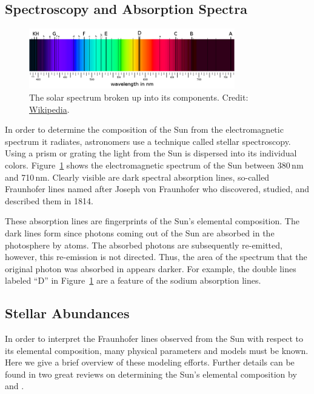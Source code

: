 \subsection{Spectroscopy and Absorption Spectra}

\begin{figure}[tb]
    \centering
    \includegraphics[width=0.8\textwidth]{graphics/solar_system_abundances/fraunhofer_lines_800px}
    \caption{The solar spectrum broken up into its components. Credit: \href{https://en.wikipedia.org/wiki/Fraunhofer_lines}{Wikipedia}.}
    \label{fig:fraunhofer_lines}
\end{figure}
In order to determine the composition of the Sun from the electromagnetic spectrum it radiates, astronomers use a technique called stellar spectroscopy. Using a prism or grating the light from the Sun is dispersed into its individual colors. Figure~\ref{fig:fraunhofer_lines} shows the electromagnetic spectrum of the Sun between 380\,nm and 710\,nm. Clearly visible are dark spectral absorption lines, so-called Fraunhofer lines named after Joseph von Fraunhofer who discovered, studied, and described them in 1814.

These absorption lines are fingerprints of the Sun's elemental composition. The dark lines form since photons coming out of the Sun are absorbed in the photosphere by atoms. The absorbed photons are subsequently re-emitted, however, this re-emission is not directed. Thus, the area of the spectrum that the original photon was absorbed in appears darker. For example, the double lines labeled ``D'' in Figure~\ref{fig:fraunhofer_lines} are a feature of the sodium absorption lines.


\subsection{Stellar Abundances} \label{sec:solar_abundances:sun:stellar_abundances}

In order to interpret the Fraunhofer lines observed from the Sun with respect to its elemental composition, many physical parameters and models must be known. Here we give a brief overview of these modeling efforts. Further details can be found in two great reviews on determining the Sun's elemental composition by \citet{asplund09} and \citet{allende-prieto16}.

